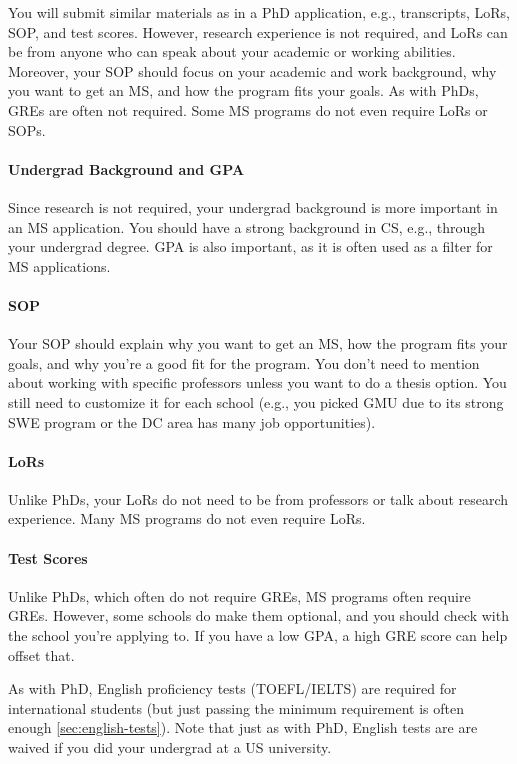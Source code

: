 \documentclass[oneside,11pt,dvipsnames]{book}
\begin{document}
You will submit similar materials as in a PhD application, e.g., transcripts, LoRs, SOP, and test scores.  However, research experience is not required, and LoRs can be from anyone who can speak about your academic or working abilities. Moreover, your SOP should focus on your academic and work background, why you want to get an MS, and how the program fits your goals. As with PhDs, GREs are often not required. Some MS programs do not even require LoRs or SOPs.  

\paragraph{Undergrad Background and GPA} Since research is not required, your undergrad background is more important in an MS application.  You should have a strong background in CS, e.g., through your undergrad degree.  GPA is also important, as it is often used as a filter for MS applications.

\paragraph{SOP} Your SOP should explain why you want to get an MS, how the program fits your goals, and why you're a good fit for the program.  You don't need to mention about working with specific professors unless you want to do a thesis option. You still need to customize it for each school (e.g., you picked GMU due to its strong SWE program or the DC area has many job opportunities).

\paragraph{LoRs} Unlike PhDs, your LoRs do not need to be from professors or talk about research experience. Many MS programs do not even require LoRs.

\paragraph{Test Scores} Unlike PhDs, which often do not require GREs, MS programs often require GREs.  However, some schools do make them optional, and you should check with the school you're applying to.  If you have a low GPA, a high GRE score can help offset that. 

As with PhD, English proficiency tests (TOEFL/IELTS) are required for international students (but just passing the minimum requirement is often enough \autoref{sec:english-tests}). Note that just as with PhD, English tests are are waived if you did your undergrad at a US university.
\end{document}
